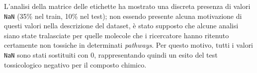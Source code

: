 L'analisi della matrice delle etichette ha mostrato una discreta presenza di valori \texttt{NaN} (35\% nel train, 10\% nel test); non essendo presente alcuna motivazione di questi valori nella descrizione del dataset, è stato supposto che alcune analisi siano state tralasciate per quelle molecole che i ricercatore hanno ritenuto certamente non tossiche in determinati \textit{pathways}. Per questo motivo, tutti i valori \texttt{NaN} sono stati sostituiti con $0$, rappresentando quindi un esito del test tossicologico negativo per il composto chimico. \\
\begin{figure}[!ht]
	\centering
	\quad
	\quad
	\quad
	\\	\quad
	\quad

\end{figure}
